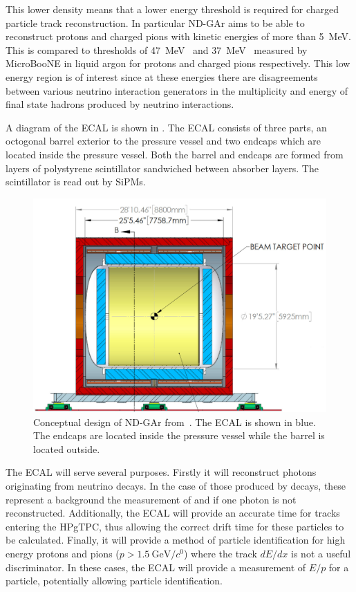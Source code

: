 This lower density means that a lower energy threshold is required for charged particle track reconstruction.
In particular ND-GAr aims to be able to reconstruct protons and charged pions with kinetic energies of more than \SI{5}{\mega\electronvolt}.
This is compared to thresholds of \SI{47}{\mega\electronvolt}~\cite{uBooneProtonThreshold} and \SI{37}{\mega\electronvolt}~\cite{uBoonePionThreshold} measured by MicroBooNE in liquid argon for protons and charged pions respectively.
This low energy region is of interest since at these energies there are disagreements between various neutrino interaction generators in the multiplicity and energy of final state hadrons produced by neutrino interactions.

A diagram of the ECAL is shown in .
The ECAL consists of three parts, an octogonal barrel exterior to the pressure vessel and two endcaps which are located inside the pressure vessel.
Both the barrel and endcaps are formed from layers of polystyrene scintillator sandwiched between absorber layers.
The scintillator is read out by SiPMs.

\begin{figure}[h]
  \centering
  \includegraphics[width=.7\linewidth]{files/figures/dune_detector/ecalDiag}
  \caption[Diagram of ND-GAr ECAL]{Conceptual design of ND-GAr from~\cite{ndCdr}. The ECAL is shown in blue. The endcaps are located inside the pressure vessel while the barrel is located outside.}
  \label{fig:ecalDiag}
\end{figure}

The ECAL will serve several purposes.
Firstly it will reconstruct photons originating from neutrino decays.
In the case of those produced by \pizero decays, these represent a background the measurement of \nue and \anue if one photon is not reconstructed.
Additionally, the ECAL will provide an accurate time for tracks entering the HPgTPC, thus allowing the correct drift time for these particles to be calculated.
Finally, it will provide a method of particle identification for high energy protons and pions ($p > \SI{1.5}{\giga\electronvolt\per\clight}$) where the track $dE/dx$ is not a useful discriminator.
In these cases, the ECAL will provide a measurement of $E/p$ for a particle, potentially allowing particle identification.

